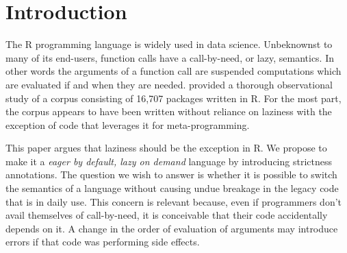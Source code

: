\documentclass[screen,acmsmall]{acmart}
\begin{document}


\maketitle
\section{Introduction}

The R programming language is widely used in data science. Unbeknownst to many
of its end-users, function calls have a call-by-need, or lazy, semantics. In
other words the arguments of a function call are suspended computations which
are evaluated if and when they are needed. \citet{oopsla19b} provided a thorough
observational study of a corpus consisting of 16,707 packages written in R. For
the most part, the corpus appears to have been written without reliance on
laziness with the exception of code that leverages it for meta-programming.

This paper argues that laziness should be the exception in R. We propose to make
it a \emph{eager by default, lazy on demand} language by introducing strictness
annotations. The question we wish to answer is whether it is possible to switch
the semantics of a language without causing undue breakage in the legacy code
that is in daily use. This concern is relevant because, even if programmers
don't avail themselves of call-by-need, it is conceivable that their code
accidentally depends on it. A change in the order of evaluation of arguments may
introduce errors if that code was performing side effects.
\end{document}

